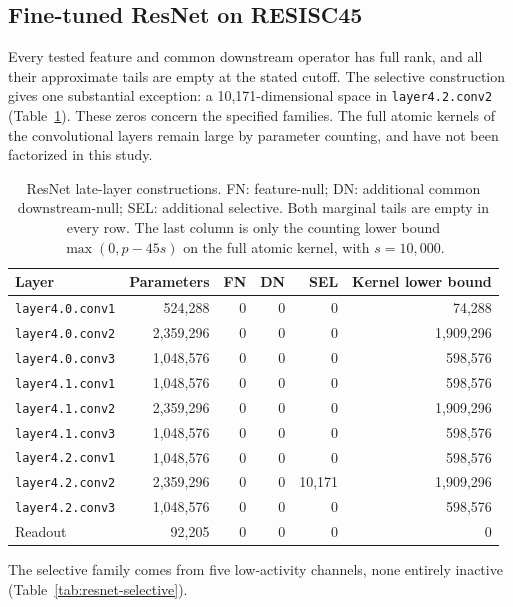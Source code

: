 \subsection{Fine-tuned ResNet on RESISC45}
\label{app:resnet-common}

Every tested feature and common downstream operator has full rank, and all their approximate tails are empty at the stated cutoff. The selective construction gives one substantial exception: a 10,171-dimensional space in \texttt{layer4.2.conv2} (Table~\ref{tab:resnet-common}). These zeros concern the specified families. The full atomic kernels of the convolutional layers remain large by parameter counting, and have not been factorized in this study.

\begin{table}[!htbp]\centering
\caption{ResNet late-layer constructions. FN: feature-null; DN: additional common downstream-null; SEL: additional selective. Both marginal tails are empty in every row. The last column is only the counting lower bound $\max(0,p-45s)$ on the full atomic kernel, with $s=10,000$.}
\label{tab:resnet-common}
\small\begin{tabular}{lrrrrr}\toprule
Layer & Parameters & FN & DN & SEL & Kernel lower bound\\\midrule
\texttt{layer4.0.conv1} & 524,288 & 0 & 0 & 0 & 74,288\\
\texttt{layer4.0.conv2} & 2,359,296 & 0 & 0 & 0 & 1,909,296\\
\texttt{layer4.0.conv3} & 1,048,576 & 0 & 0 & 0 & 598,576\\
\texttt{layer4.1.conv1} & 1,048,576 & 0 & 0 & 0 & 598,576\\
\texttt{layer4.1.conv2} & 2,359,296 & 0 & 0 & 0 & 1,909,296\\
\texttt{layer4.1.conv3} & 1,048,576 & 0 & 0 & 0 & 598,576\\
\texttt{layer4.2.conv1} & 1,048,576 & 0 & 0 & 0 & 598,576\\
\texttt{layer4.2.conv2} & 2,359,296 & 0 & 0 & 10,171 & 1,909,296\\
\texttt{layer4.2.conv3} & 1,048,576 & 0 & 0 & 0 & 598,576\\
Readout & 92,205 & 0 & 0 & 0 & 0\\\bottomrule
\end{tabular}
\end{table}

The selective family comes from five low-activity channels, none entirely inactive (Table~\ref{tab:resnet-selective}).

